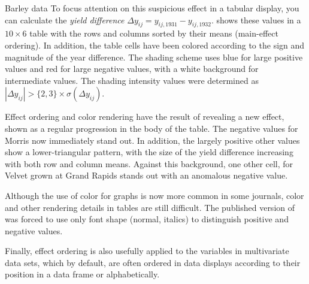 \documentclass[10pt,krantz2]{krantz}\usepackage[]{graphicx}\usepackage[]{color}
\begin{document}
\begin{Example}[barley]{Barley data}
To focus attention on this suspicious effect in a tabular display,
you can calculate the \emph{yield difference}
$\Delta y_{ij} = y_{ij,1931} - y_{ij,1932}$.
 shows these values in a $10 \times 6$ table with the rows and columns
sorted by their means (main-effect ordering).  In addition, the table cells
have been colored according to the sign and magnitude of the year difference.
The shading scheme uses blue for large positive values and red for large
negative values, with a white background for intermediate values.
The shading intensity values were determined as
$| \Delta y_{ij} |> \{2, 3\} \times \widehat{\sigma} (\Delta y_{ij} )$.




Effect ordering and color rendering
have the result of revealing a new effect, shown as a regular progression
in the body of the table.
The negative values for Morris now immediately stand out.  In addition,
the largely positive other values show a lower-triangular pattern,
with the size of the yield difference increasing with both row and column means.
Against this background, one other cell, for Velvet grown at Grand Rapids stands out
with an anomalous negative value.

Although the use of color for graphs is now more common in some journals,
color and other rendering details in tables are still difficult.
The published version of  \citep[Table 3]{FriendlyKwan:02:effect}
was forced to use only font shape (normal, italics) to distinguish positive and
negative values.

\end{Example}

Finally, effect ordering is also usefully applied to the variables in multivariate data
sets, which by default, are often ordered in data displays according to their position
in a data frame or alphabetically.
\end{document}
